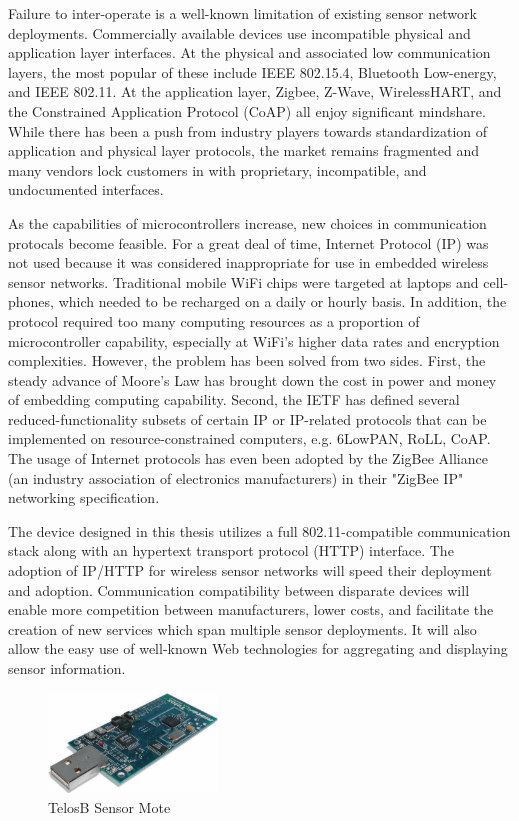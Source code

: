 Failure to inter-operate is a well-known limitation of existing sensor network deployments. Commercially available devices use incompatible physical and application layer interfaces. At the physical and associated low communication layers, the most popular of these include IEEE 802.15.4, Bluetooth Low-energy, and IEEE 802.11. At the application layer, Zigbee, Z-Wave, WirelessHART, and the Constrained Application Protocol (CoAP) all enjoy significant mindshare. While there has been a push from industry players towards standardization of application and physical layer protocols, the market remains fragmented and many vendors lock customers in with proprietary, incompatible, and undocumented interfaces.

As the capabilities of microcontrollers increase, new choices in communication protocals become feasible. For a great deal of time, Internet Protocol (IP) was not used because it was considered inappropriate for use in embedded wireless sensor networks. Traditional mobile WiFi chips were targeted at laptops and cell-phones, which needed to be recharged on a daily or hourly basis. In addition, the protocol required too many computing resources as a proportion of microcontroller capability, especially at WiFi's higher data rates and encryption complexities. However, the problem has been solved from two sides. First, the steady advance of Moore's Law has brought down the cost in power and money of embedding computing capability. Second, the IETF has defined several reduced-functionality subsets of certain IP or IP-related protocols that can be implemented on resource-constrained computers, e.g. 6LowPAN\cite{Montenegro2007}, RoLL\cite{RFC6550}, CoAP\cite{Z.Shelby2014}. The usage of Internet protocols has even been adopted by the ZigBee Alliance (an industry association of electronics manufacturers) in their "ZigBee IP" networking specification.

The device designed in this thesis utilizes a full 802.11-compatible communication stack along with an  hypertext transport protocol (HTTP) interface. The adoption of IP/HTTP for wireless sensor networks will speed their deployment and adoption. Communication compatibility between disparate devices will enable more competition between manufacturers, lower costs, and facilitate the creation of new services which span multiple sensor deployments. It will also allow the easy use of well-known Web technologies for aggregating and displaying sensor information.

\begin{figure}[h]
\includegraphics[width=0.4\textwidth]{images/telosb}
\caption{TelosB Sensor Mote\cite{1440950}}
\label{telosB}
\end{figure}

